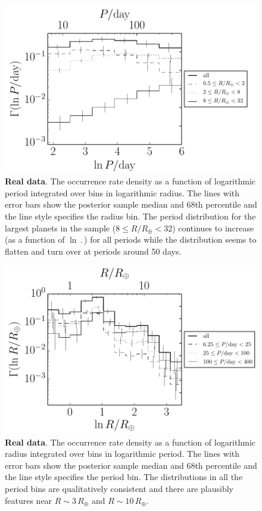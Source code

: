 \begin{figure}[p]
\begin{center}
\includegraphics{figures/exopop/results/period.pdf}
\end{center}
\caption[The period distribution of exoplanets]{%
{\bf Real data}.
The occurrence rate density as a function of logarithmic period integrated
over bins in logarithmic radius.
The lines with error bars show the posterior sample median and 68th
percentile and the line style specifies the radius bin.
The period distribution for the largest planets in the sample
($8 \le R/R_\oplus < 32$) continues to increase (as a function of
$\ln\period$) for all periods while the distribution seems to flatten and
turn over at periods around 50 days.
}
\end{figure}

\begin{figure}[p]
\begin{center}
\includegraphics{figures/exopop/results/radius.pdf}
\end{center}
\caption[The radius distribution of exoplanets]{%
{\bf Real data}.
The occurrence rate density as a function of logarithmic radius integrated
over bins in logarithmic period.
The lines with error bars show the posterior sample median and 68th
percentile and the line style specifies the period bin.
The distributions in all the period bins are qualitatively consistent and
there are plausibly features near $R\sim3\,R_\oplus$ and $R\sim10\,R_\oplus$.
}
\end{figure}

